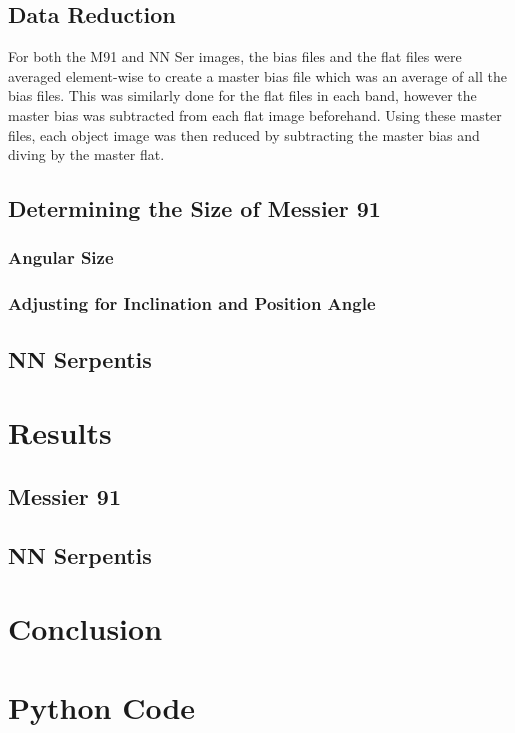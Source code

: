 \documentclass[%
reprint,
amsmath,amssymb,
aps,
]{revtex4-2}
\begin{document}
		\subsection{Data Reduction}
			
			 For both the M91 and NN Ser images, the bias files and the flat files were averaged element-wise to create a master bias file which was an average of all the bias files. This was similarly done for the flat files in each band, however the master bias was subtracted from each flat image beforehand. Using these master files, each object image was then reduced by subtracting the master bias and diving by the master flat.
		
		\subsection{Determining the Size of Messier 91}
			
			\subsubsection{Angular Size}
			
			\subsubsection{Adjusting for Inclination and Position Angle}
		
		
		\subsection{NN Serpentis}
		
		
	\section{Results}
	
		\subsection{Messier 91}
		
		\subsection{NN Serpentis}

	\section{Conclusion}
		
		
		
	\appendix
		
	\section{Python Code}
		
		
		
\end{document}
